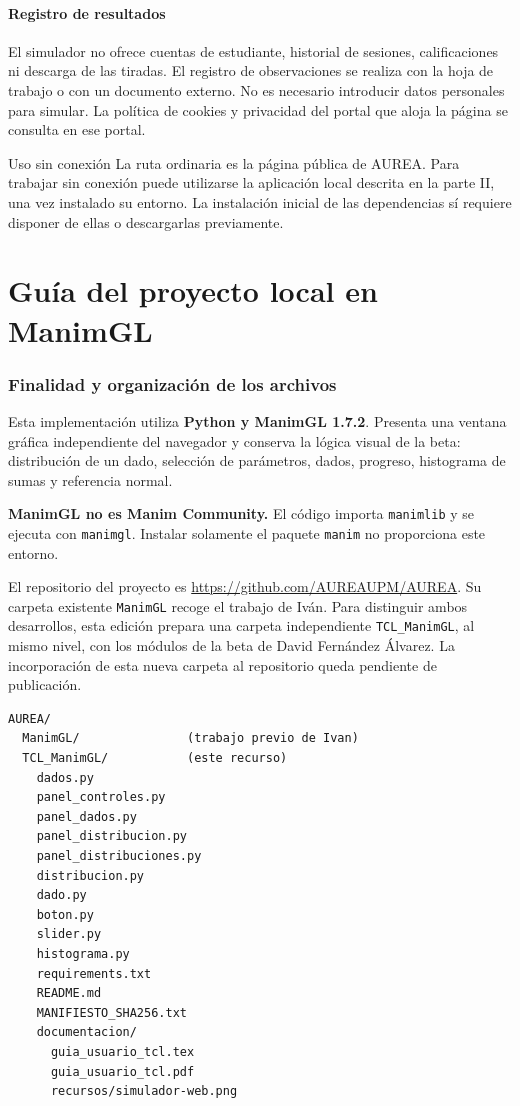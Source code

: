 \documentclass[11pt,a4paper]{article}
\begin{document}
\subsection{Registro de resultados}
El simulador no ofrece cuentas de estudiante, historial de sesiones, calificaciones ni descarga de las tiradas. El registro de observaciones se realiza con la hoja de trabajo o con un documento externo. No es necesario introducir datos personales para simular. La política de cookies y privacidad del portal que aloja la página se consulta en ese portal.

\begin{nota}{Uso sin conexión}
La ruta ordinaria es la página pública de AUREA. Para trabajar sin conexión puede utilizarse la aplicación local descrita en la parte II, una vez instalado su entorno. La instalación inicial de las dependencias sí requiere disponer de ellas o descargarlas previamente.
\end{nota}

\clearpage\part{Guía del proyecto local en ManimGL}
\section{Finalidad y organización de los archivos}
Esta implementación utiliza \textbf{Python y ManimGL 1.7.2}. Presenta una ventana gráfica independiente del navegador y conserva la lógica visual de la beta: distribución de un dado, selección de parámetros, dados, progreso, histograma de sumas y referencia normal.

\textbf{ManimGL no es Manim Community.} El código importa \texttt{manimlib} y se ejecuta con \texttt{manimgl}. Instalar solamente el paquete \texttt{manim} no proporciona este entorno.

El repositorio del proyecto es \url{https://github.com/AUREAUPM/AUREA}. Su carpeta existente \texttt{ManimGL} recoge el trabajo de Iván. Para distinguir ambos desarrollos, esta edición prepara una carpeta independiente \texttt{TCL\_ManimGL}, al mismo nivel, con los módulos de la beta de David Fernández Álvarez. La incorporación de esta nueva carpeta al repositorio queda pendiente de publicación.

\begin{lstlisting}
AUREA/
  ManimGL/               (trabajo previo de Ivan)
  TCL_ManimGL/           (este recurso)
    dados.py
    panel_controles.py
    panel_dados.py
    panel_distribucion.py
    panel_distribuciones.py
    distribucion.py
    dado.py
    boton.py
    slider.py
    histograma.py
    requirements.txt
    README.md
    MANIFIESTO_SHA256.txt
    documentacion/
      guia_usuario_tcl.tex
      guia_usuario_tcl.pdf
      recursos/simulador-web.png
\end{lstlisting}
\end{document}
